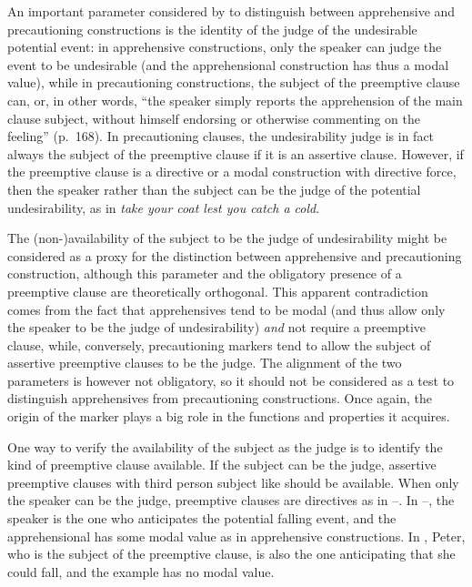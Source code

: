 \documentclass[output=paper,colorlinks,citecolor=brown]{langscibook}
\begin{document}
An important parameter considered by \citet{green1989} to distinguish between apprehensive and precautioning constructions is the identity of the judge of the undesirable potential event: in apprehensive constructions, only the speaker can judge the event to be undesirable (and the apprehensional construction has thus a modal value), while in precautioning constructions, the subject of the preemptive clause can, or, in other words, ``the speaker simply reports the apprehension of the main clause subject, without himself endorsing or otherwise commenting on the feeling'' (p.\ 168). In precautioning clauses, the undesirability judge is in fact always the subject of the preemptive clause if it is an assertive clause. However, if the preemptive clause is a directive or a modal construction with directive force, then the speaker rather than the subject can be the judge of the potential undesirability, as in \textit{take your coat lest you catch a cold}.

The (non-)availability of the subject to be the judge of undesirability might be considered as a proxy for the distinction between apprehensive and precautioning construction, although this parameter and the obligatory presence of a preemptive clause are theoretically orthogonal. This apparent contradiction comes from the fact that apprehensives tend to be modal (and thus allow only the speaker to be the judge of undesirability) \textit{and} not require a preemptive clause, while, conversely, precautioning markers tend to allow the subject of assertive preemptive clauses to be the judge. The alignment of the two parameters is however not obligatory, so it should not be considered as a test to distinguish apprehensives from precautioning constructions. Once again, the origin of the marker plays a big role in the functions and properties it acquires.

One way to verify the availability of the subject as the judge is to identify the kind of preemptive clause available. If the subject can be the judge, assertive preemptive clauses with third person subject like  should be available. When only the speaker can be the judge,  preemptive clauses are directives as in --. In --, the speaker is the one who anticipates the potential falling event, and the apprehensional has some modal value as in apprehensive constructions. In , Peter, who is the subject of the preemptive clause, is also the one anticipating that she could fall, and the example has no modal value.
\end{document}
